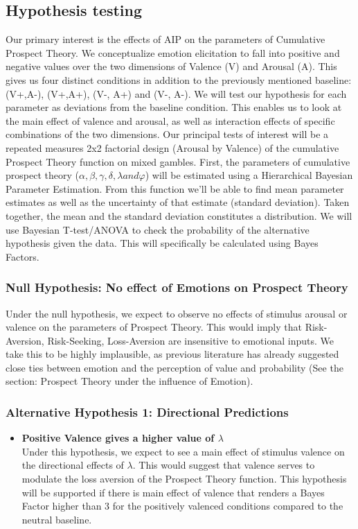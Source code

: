 \documentclass{article}
\begin{document}
    \subsection{Hypothesis testing}
    Our primary interest is the effects of AIP on the parameters of Cumulative Prospect Theory. We conceptualize emotion elicitation to fall into positive and negative values over the two dimensions of Valence (V) and Arousal (A). This gives us four distinct conditions in addition to the previously mentioned baseline: (V+,A-), (V+,A+), (V-, A+) and (V-, A-). We will test our hypothesis for each parameter as deviations from the baseline condition. This enables us to look at the main effect of valence and arousal, as well as interaction effects of specific combinations of the two dimensions. 
    Our principal tests of interest will be a repeated measures 2x2 factorial design (Arousal by Valence) of the cumulative Prospect Theory function on mixed gambles. First, the parameters of cumulative prospect theory ($\alpha, \beta, \gamma, \delta, \lambda and \varphi$) will be estimated using a Hierarchical Bayesian Parameter Estimation. From this function we’ll be able to find mean parameter estimates as well as the uncertainty of that estimate (standard deviation). 
    Taken together, the mean and the standard deviation constitutes a distribution. We will use Bayesian T-test/ANOVA to check the probability of the alternative hypothesis given the data. This will specifically be calculated using Bayes Factors.
    \subsubsection{Null Hypothesis: No effect of Emotions on Prospect Theory}
    Under the null hypothesis, we expect to observe no effects of stimulus arousal or valence on the parameters of Prospect Theory. This would imply that Risk-Aversion, Risk-Seeking, Loss-Aversion are insensitive to emotional inputs. We take this to be highly implausible, as previous literature has already suggested close ties between emotion and the perception of value and probability (See the section: Prospect Theory under the influence of Emotion).    
    \subsubsection{Alternative Hypothesis 1: Directional Predictions}
    \begin{itemize}
        \item \textbf{Positive Valence gives a higher value of $\lambda$}\\
        Under this hypothesis, we expect to see a main effect of stimulus valence on the directional effects of $\lambda$. This would suggest that valence serves to modulate the loss aversion of the Prospect Theory function. This hypothesis will be supported if there is main effect of valence that renders a Bayes Factor higher than 3 for the positively valenced conditions compared to the neutral baseline. 
    \end{itemize}
    
\end{document}
